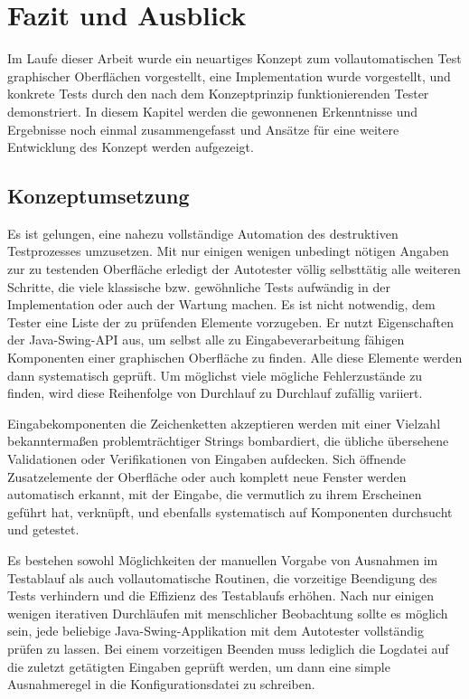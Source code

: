 \chapter{Fazit und Ausblick}\label{chapter:expansion}

Im Laufe dieser Arbeit wurde ein neuartiges Konzept zum vollautomatischen
Test graphischer Oberflächen vorgestellt, eine Implementation wurde
vorgestellt, und konkrete Tests durch den nach dem Konzeptprinzip
funktionierenden Tester demonstriert. In diesem Kapitel werden
die gewonnenen Erkenntnisse und Ergebnisse noch einmal zusammengefasst 
und Ansätze für eine weitere Entwicklung des Konzept werden aufgezeigt.


\section{Konzeptumsetzung}\label{section:conceptimplement}

Es ist gelungen, eine nahezu vollständige Automation des destruktiven
Testprozesses umzusetzen. Mit nur einigen wenigen unbedingt nötigen Angaben
zur zu testenden Oberfläche erledigt der Autotester völlig selbsttätig
alle weiteren Schritte, die viele klassische bzw. gewöhnliche Tests aufwändig
in der Implementation oder auch der Wartung machen. Es ist nicht notwendig,
dem Tester eine Liste der zu prüfenden Elemente vorzugeben. Er nutzt
Eigenschaften der Java-Swing-API aus, um selbst alle zu Eingabeverarbeitung
fähigen Komponenten einer graphischen Oberfläche zu finden. Alle diese
Elemente werden dann systematisch geprüft. Um möglichst viele
mögliche Fehlerzustände zu finden, wird diese Reihenfolge von Durchlauf
zu Durchlauf zufällig variiert.

Eingabekomponenten die Zeichenketten akzeptieren werden mit einer
Vielzahl bekanntermaßen problemträchtiger Strings bombardiert,
die übliche übersehene Validationen oder Verifikationen von
Eingaben aufdecken. Sich öffnende Zusatzelemente der Oberfläche
oder auch komplett neue Fenster werden automatisch erkannt, mit
der Eingabe, die vermutlich zu ihrem Erscheinen geführt hat, verknüpft,
und ebenfalls systematisch auf Komponenten durchsucht und getestet.

Es bestehen sowohl Möglichkeiten der manuellen Vorgabe von
Ausnahmen im Testablauf als auch vollautomatische Routinen,
die vorzeitige Beendigung des Tests verhindern und die
Effizienz des Testablaufs erhöhen. Nach nur einigen wenigen iterativen
Durchläufen mit menschlicher Beobachtung sollte es möglich sein, 
jede beliebige Java-Swing-Applikation mit dem Autotester vollständig 
prüfen zu lassen. Bei einem vorzeitigen Beenden muss lediglich die
Logdatei auf die zuletzt getätigten Eingaben geprüft werden,
um dann eine simple Ausnahmeregel in die Konfigurationsdatei zu schreiben.

